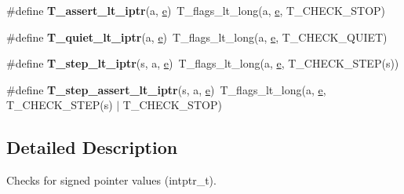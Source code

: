 \begin{DoxyCompactItemize}
\item 
\mbox{\label{group__RTEMSTestFrameworkChecksIntptr_gab21ddf1858283688159691f478bb931f}} 
\#define {\bfseries T\+\_\+assert\+\_\+lt\+\_\+iptr}(a,  \mbox{\hyperlink{sun4u_2tte_8h_a8b0b9ed08e0e18920ec2682f48228c27}{e}})~T\+\_\+flags\+\_\+lt\+\_\+long(a, \mbox{\hyperlink{sun4u_2tte_8h_a8b0b9ed08e0e18920ec2682f48228c27}{e}}, T\+\_\+\+C\+H\+E\+C\+K\+\_\+\+S\+T\+OP)
\item 
\mbox{\label{group__RTEMSTestFrameworkChecksIntptr_gadc7b3a9db07ca9c1efc56b7441db9ef9}} 
\#define {\bfseries T\+\_\+quiet\+\_\+lt\+\_\+iptr}(a,  \mbox{\hyperlink{sun4u_2tte_8h_a8b0b9ed08e0e18920ec2682f48228c27}{e}})~T\+\_\+flags\+\_\+lt\+\_\+long(a, \mbox{\hyperlink{sun4u_2tte_8h_a8b0b9ed08e0e18920ec2682f48228c27}{e}}, T\+\_\+\+C\+H\+E\+C\+K\+\_\+\+Q\+U\+I\+ET)
\item 
\mbox{\label{group__RTEMSTestFrameworkChecksIntptr_ga14767031713c2636dfb0d4fc7342cf44}} 
\#define {\bfseries T\+\_\+step\+\_\+lt\+\_\+iptr}(s,  a,  \mbox{\hyperlink{sun4u_2tte_8h_a8b0b9ed08e0e18920ec2682f48228c27}{e}})~T\+\_\+flags\+\_\+lt\+\_\+long(a, \mbox{\hyperlink{sun4u_2tte_8h_a8b0b9ed08e0e18920ec2682f48228c27}{e}}, T\+\_\+\+C\+H\+E\+C\+K\+\_\+\+S\+T\+EP(s))
\item 
\mbox{\label{group__RTEMSTestFrameworkChecksIntptr_gad5eb72046cc43189211b7ce471fe3651}} 
\#define {\bfseries T\+\_\+step\+\_\+assert\+\_\+lt\+\_\+iptr}(s,  a,  \mbox{\hyperlink{sun4u_2tte_8h_a8b0b9ed08e0e18920ec2682f48228c27}{e}})~T\+\_\+flags\+\_\+lt\+\_\+long(a, \mbox{\hyperlink{sun4u_2tte_8h_a8b0b9ed08e0e18920ec2682f48228c27}{e}}, T\+\_\+\+C\+H\+E\+C\+K\+\_\+\+S\+T\+EP(s) $\vert$ T\+\_\+\+C\+H\+E\+C\+K\+\_\+\+S\+T\+OP)
\end{DoxyCompactItemize}


\subsection{Detailed Description}
Checks for signed pointer values (intptr\+\_\+t). 

